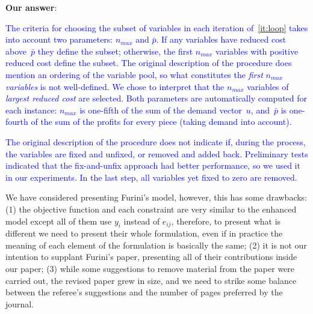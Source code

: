\documentclass[smallextended]{svjour3}       %
\makeatletter
\newif\iffinalversion
\newcommand{\newtext}[1]{\iffinalversion%
#1%
\else%
\textcolor{blue}{#1}%
\fi%
}
\newcommand\gobblepars{%
    \@ifnextchar\par%
        {\expandafter\gobblepars\@gobble}%
        {}}
\newcounter{answer}
\newenvironment{answer}{%
    \refstepcounter{answer}\par\smallskip\noindent%
    \textbf{Our answer}: \gobblepars}%
    {\unskip\bigskip}
\makeatother
\begin{document}
\begin{answer}
\newtext{
The criteria for choosing the subset of variables in each iteration of~\autoref{it:loop} takes into account two parameters: \(n_{max}\) and \(\bar{p}\). If any variables have reduced cost above~\(\bar{p}\) they define the subset; otherwise, the first \(n_{max}\) variables with positive reduced cost define the subset. The original description of the procedure does mention an ordering of the variable pool, so what constitutes the \emph{first} \(n_{max}\) \emph{variables} is not well-defined. We chose to interpret that the \(n_{max}\) variables of \emph{largest reduced cost} are selected. Both parameters are automatically computed for each instance: \(n_{max}\) is one-fifth of the sum of the demand vector~\(u\), and~\(\bar{p}\) is one-fourth of the sum of the profits for every piece (taking demand into account).
}

\newtext{
The original description of the procedure does not indicate if, during the process, the variables are fixed and unfixed, or removed and added back.
Preliminary tests indicated that the fix-and-unfix approach had better performance, so we used it in our experiments.
In the last step, all variables yet fixed to zero are removed.
}

We have considered presenting Furini's model, however, this has some drawbacks: (1) the objective function and each constraint are very similar to the enhanced model except all of them use \(y_i\) instead of \(e_{ij}\), therefore, to present what is different we need to present their whole formulation, even if in practice the meaning of each element of the formulation is basically the same; (2) it is not our intention to supplant Furini's paper, presenting all of their contributions inside our paper; (3) while some suggestions to remove material from the paper were carried out, the revised paper grew in size, and we need to strike some balance between the referee's suggestions and the number of pages preferred by the journal.
\end{answer}
\end{document}
